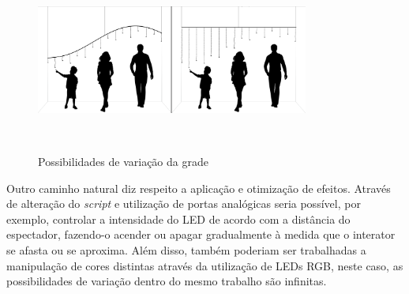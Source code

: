 \begin{figure}[H]
  \begin{center}
    \caption{Possibilidades de variação da grade}
    \vspace*{0,2cm}
    \includegraphics[width=0.8\textwidth]{./04-figuras/malha_futuro}
    \label{fig:malha_futuro}
  \end{center}
  \vspace*{-0,5cm}
  \\
\end{figure}

Outro caminho natural diz respeito a aplicação e otimização de efeitos. Através de alteração do \textit{script} e utilização de portas analógicas seria possível, por exemplo, controlar a intensidade do LED de acordo com a distância do espectador, fazendo-o acender ou apagar gradualmente à medida que o interator se afasta ou se aproxima. Além disso, também poderiam ser trabalhadas a manipulação de cores distintas através da utilização de LEDs RGB, neste caso, as possibilidades de variação dentro do mesmo trabalho são infinitas.

